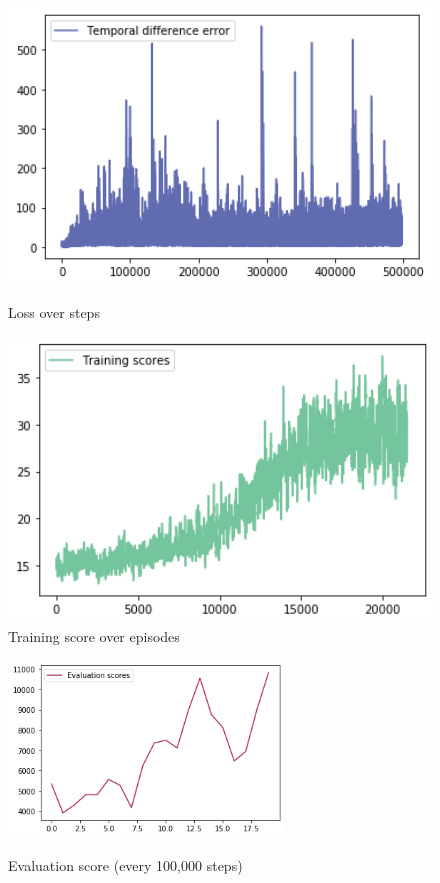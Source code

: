 \documentclass[12pt]{article}
\begin{document}
\begin{figure}[H]
	\centering
	\begin{minipage}{0.49\textwidth}
		\centering
		\includegraphics[width=1\textwidth]{images/7_loss.png} %
		\caption{Loss over steps}
	\end{minipage}\hfill
	\begin{minipage}{0.49\textwidth}
		\centering
		\includegraphics[width=1\textwidth]{images/7_score_train.png} %
		\caption{Training score over episodes}
	\end{minipage}
	\label{fig:centipede_loss_trainscore}
\end{figure}

\begin{figure}[H]
	\centering
	\includegraphics[width=0.65\textwidth]{images/7_score_eval.png} 
	\label{fig:centipede_evalscore}
	\caption{Evaluation score (every 100,000 steps)}
\end{figure}
\end{document}
